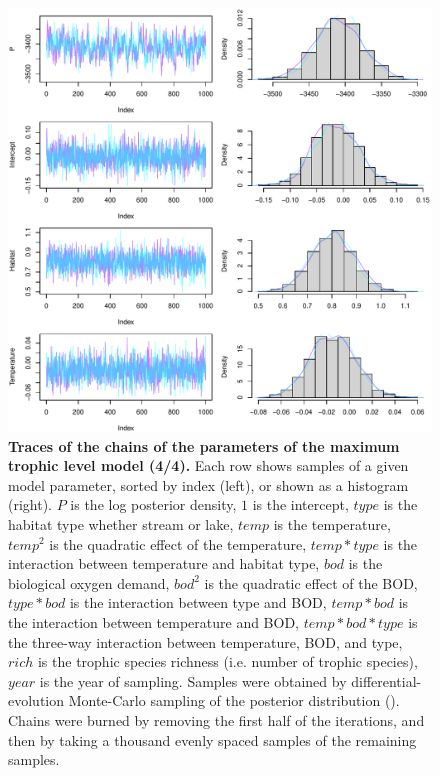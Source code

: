 \documentclass[11pt, oneside]{article}
\begin{document}
\begin{figure}[H]
\begin{center}
\includegraphics[page=4, width=1\linewidth]{b0_6_3/out_mTL/fig_tracePlot_beta.pdf}
\caption{
    \textbf{Traces of the chains of the parameters of the maximum trophic level model (4/4).}
    Each row shows samples of a given model parameter, sorted by index (left), or shown as a histogram (right).
    $P$ is the log posterior density, $1$ is the intercept, $type$ is the habitat type whether stream or lake, $temp$ is the temperature, $temp^2$ is the quadratic effect of the temperature, $temp * type$ is the interaction between temperature and habitat type, $bod$ is the biological oxygen demand, $bod^2$ is the quadratic effect of the BOD, $type * bod$ is the interaction between type and BOD, $temp * bod$ is the interaction between temperature and BOD, $temp * bod * type$ is the three-way interaction between temperature, BOD, and type, $rich$ is the trophic species richness (i.e. number of trophic species), $year$ is the year of sampling.
    Samples were obtained by differential-evolution Monte-Carlo sampling of the posterior distribution (\cite{TerBraak2006}).
    Chains were burned by removing the first half of the iterations, and then by taking a thousand evenly spaced samples of the remaining samples.
} 
\end{center}
\end{figure}
\end{document}
